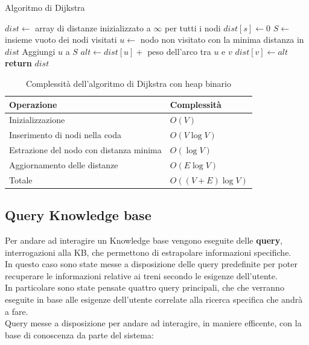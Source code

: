 \documentclass[italian,12pt,a4paper]{article}
\begin{document}
	\begin{algorithm}[h]
		\caption{Algoritmo di Dijkstra}
		\begin{algorithmic}[1]
			\State $dist \gets$ array di distanze inizializzato a $\infty$ per tutti i nodi
			\State $dist[s] \gets 0$
			\State $S \gets$ insieme vuoto dei nodi visitati
			\State $u \gets$ nodo non visitato con la minima distanza in $dist$
			\State Aggiungi $u$ a $S$
			\State $alt \gets dist[u] +$ peso dell'arco tra $u$ e $v$
			\State $dist[v] \gets alt$
			\EndIf
			\EndFor
			\EndWhile
			\State \textbf{return} $dist$ 
			\EndProcedure
		\end{algorithmic}
	\end{algorithm}
	\vspace{200px}
	
	\begin{table}[h]
		\centering
		\begin{tabular}{|l|l|}
			\hline
			\textbf{Operazione} & \textbf{Complessità} \\ \hline
			Inizializzazione & $O(V)$ \\ \hline
			Inserimento di nodi nella coda & $O(V \log V)$ \\ \hline
			Estrazione del nodo con distanza minima & $O(\log V)$ \\ \hline
			Aggiornamento delle distanze & $O(E \log V)$ \\ \hline
			Totale & $O((V + E) \log V)$ \\ \hline
		\end{tabular}
		\caption{Complessità dell'algoritmo di Dijkstra con heap binario}
	\end{table}
	
	\vspace{20px}

	\subsection{Query Knowledge base}
	Per andare ad interagire un Knowledge base vengono eseguite delle \textbf{query}, interrogazioni alla KB, che permettono di estrapolare informazioni specifiche.\\
	In questo caso sono state messe a disposizione delle query predefinite per poter recuperare le informazioni relative ai treni secondo le esigenze dell'utente. \\
	In particolare sono state pensate quattro query principali, che che verranno eseguite in base alle esigenze dell'utente correlate alla ricerca specifica che andrà a fare.\\
	\linebreak
	\newpage
	Query messe a disposizione per andare ad interagire, in maniere efficente, con la base di conoscenza da parte del sistema: \\
	
\end{document}
